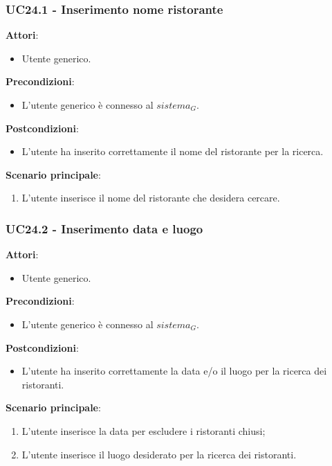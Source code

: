 \subsubsection{UC24.1 - Inserimento nome ristorante
}\label{usecase:24_1}
\textbf{Attori}:
\begin{itemize}
    \item Utente generico.
\end{itemize}
\textbf{Precondizioni}:
\begin{itemize}
    \item L'utente generico è connesso al $\textit{sistema}_G$.
\end{itemize}
\textbf{Postcondizioni}:
\begin{itemize}
    \item L'utente ha inserito correttamente il nome del ristorante per la ricerca.
\end{itemize}
\textbf{Scenario principale}:
\begin{enumerate}
    \item L'utente inserisce il nome del ristorante che desidera cercare.
\end{enumerate}

\subsubsection{UC24.2 - Inserimento data e luogo
}\label{usecase:24_2}
\textbf{Attori}:
\begin{itemize}
    \item Utente generico.
\end{itemize}
\textbf{Precondizioni}:
\begin{itemize}
    \item L'utente generico è connesso al $\textit{sistema}_G$.
\end{itemize}
\textbf{Postcondizioni}:
\begin{itemize}
    \item L'utente ha inserito correttamente la data e/o il luogo per la ricerca dei ristoranti.
\end{itemize}
\textbf{Scenario principale}:
\begin{enumerate}
    \item L'utente inserisce la data per escludere i ristoranti chiusi;
    \item L'utente inserisce il luogo desiderato per la ricerca dei ristoranti.
\end{enumerate}


